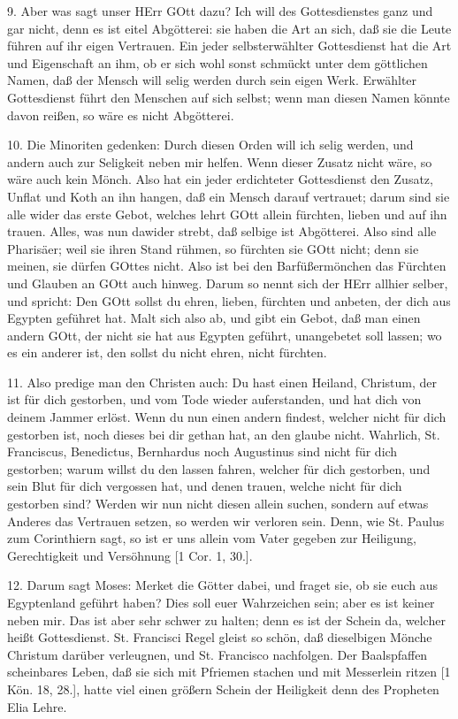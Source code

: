 9. Aber was sagt unser HErr GOtt dazu? Ich will des Gottesdienstes ganz und gar nicht, denn es ist eitel Abgötterei: sie haben die Art an sich, daß sie die Leute führen auf ihr eigen Vertrauen. Ein jeder selbsterwählter Gottesdienst hat die Art und Eigenschaft an ihm, ob er sich wohl sonst schmückt unter dem göttlichen Namen, daß der Mensch will selig werden durch sein eigen Werk. Erwählter Gottesdienst führt den Menschen auf sich selbst; wenn man diesen Namen könnte davon reißen, so wäre es nicht Abgötterei.

10. Die Minoriten gedenken: Durch diesen Orden will ich selig werden, und andern auch zur Seligkeit neben mir helfen. Wenn dieser Zusatz nicht wäre, so wäre auch kein Mönch. Also hat ein jeder erdichteter Gottesdienst den Zusatz, Unflat und Koth an ihn hangen, daß ein Mensch darauf vertrauet; darum sind sie alle wider das erste Gebot, welches lehrt GOtt allein fürchten, lieben und auf ihn trauen. Alles, was nun dawider strebt, daß selbige ist Abgötterei. Also sind alle Pharisäer; weil sie ihren Stand rühmen, so fürchten sie GOtt nicht; denn sie meinen, sie dürfen GOttes nicht. Also ist bei den Barfüßermönchen das Fürchten und Glauben an GOtt auch hinweg. Darum so nennt sich der HErr allhier selber, und spricht: Den GOtt sollst du ehren, lieben, fürchten und anbeten, der dich aus Egypten geführet hat. Malt sich also ab, und gibt ein Gebot, daß man einen andern GOtt, der nicht sie hat aus Egypten geführt, unangebetet soll lassen; wo es ein anderer ist, den sollst du nicht ehren, nicht fürchten.

11. Also predige man den Christen auch: Du hast einen Heiland, Christum, der ist für dich gestorben, und vom Tode wieder auferstanden, und hat dich von deinem Jammer erlöst. Wenn du nun einen andern findest, welcher nicht für dich gestorben ist, noch dieses bei dir gethan hat, an den glaube nicht. Wahrlich, St. Franciscus, Benedictus, Bernhardus noch Augustinus sind nicht für dich gestorben; warum willst du den lassen fahren, welcher für dich gestorben, und sein Blut für dich vergossen hat, und denen trauen, welche nicht für dich gestorben sind? Werden wir nun nicht diesen allein suchen, sondern auf etwas Anderes das Vertrauen setzen, so werden wir verloren sein. Denn, wie St. Paulus zum Corinthiern sagt, so ist er uns allein vom Vater gegeben zur Heiligung, Gerechtigkeit und Versöhnung [1 Cor. 1, 30.].

12. Darum sagt Moses: Merket die Götter dabei, und fraget sie, ob sie euch aus Egyptenland geführt haben? Dies soll euer Wahrzeichen sein; aber es ist keiner neben mir. Das ist aber sehr schwer zu halten; denn es ist der Schein da, welcher heißt Gottesdienst. St. Francisci Regel gleist so schön, daß dieselbigen Mönche Christum darüber verleugnen, und St. Francisco nachfolgen. Der Baalspfaffen scheinbares Leben, daß sie sich mit Pfriemen stachen und mit Messerlein ritzen [1 Kön. 18, 28.], hatte viel einen größern Schein der Heiligkeit denn des Propheten Elia Lehre.

